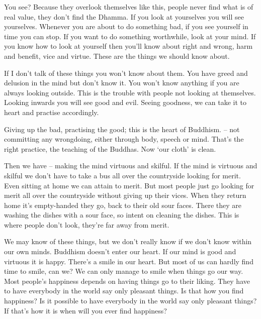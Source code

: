 You see? Because they overlook themselves like this, people never find what is of real value, they don't find the Dhamma. If you look at yourselves you will see yourselves. Whenever you are about to do something bad, if you see yourself in time you can stop. If you want to do something worthwhile, look at your mind. If you know how to look at yourself then you'll know about right and wrong, harm and benefit, vice and virtue. These are the things we should know about. 

If I don't talk of these things you won't know about them. You have greed and delusion in the mind but don't know it. You won't know anything if you are always looking outside. This is the trouble with people not looking at themselves. Looking inwards you will see good and evil. Seeing goodness, we can take it to heart and practise accordingly. 

Giving up the bad, practising the good; this is the heart of Buddhism.  -- not committing any wrongdoing, either through body, speech or mind. That's the right practice, the teaching of the Buddhas. Now `our cloth' is clean. 

Then we have  -- making the mind virtuous and skilful. If the mind is virtuous and skilful we don't have to take a bus all over the countryside looking for merit. Even sitting at home we can attain to merit. But most people just go looking for merit all over the countryside without giving up their vices. When they return home it's empty-handed they go, back to their old sour faces. There they are washing the dishes with a sour face, so intent on cleaning the dishes. This is where people don't look, they're far away from merit. 

We may know of these things, but we don't really know if we don't know within our own minds. Buddhism doesn't enter our heart. If our mind is good and virtuous it is happy. There's a smile in our heart. But most of us can hardly find time to smile, can we? We can only manage to smile when things go our way. Most people's happiness depends on having things go to their liking. They have to have everybody in the world say only pleasant things. Is that how you find happiness? Is it possible to have everybody in the world say only pleasant things? If that's how it is when will you ever find happiness? 

